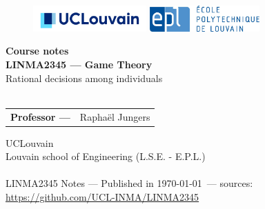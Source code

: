\ifx \globalmark \undefined %

\else
\fi



\begin{titlepage}
\begin{center}



\vfill

\begin{figure}[!ht]
  \centering
  \includegraphics[height = 1cm]{_UCLouvain_Logo_Impression_Positif_CMJN.jpg}
  \hfill
  \includegraphics[height = 1cm]{Logo_EPL.jpg}
\end{figure}







{ \bfseries Course notes }
\hrulefill\\[0.5cm]
\large{\textbf{LINMA2345 --- Game Theory}\\
Rational decisions among individuals} \\
\hrulefill\\[0.5cm]


\vfill
\vfill
\parbox[H][][c]{\textwidth}
	{
	\begin{tabular}{rl}
	\textbf{Professor ---} &  Rapha\"el Jungers \\
	\end{tabular}
	}\par




UCLouvain\\
Louvain school of Engineering (L.S.E. - E.P.L.)\\
$\,$\\
\tiny{LINMA2345 Notes --- Published in \monthyeardate\today $\,$ --- sources: \url{https://github.com/UCL-INMA/LINMA2345}}
\end{center}

\end{titlepage}







